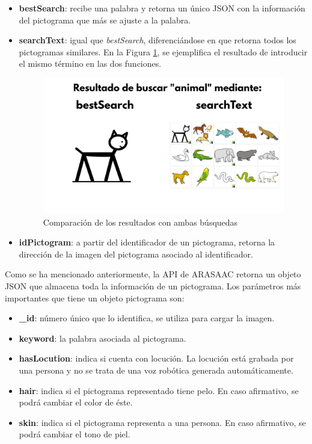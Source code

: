 \begin{itemize}
	\item \textbf{bestSearch}: recibe una palabra y retorna un único JSON con la información del pictograma que más se ajuste a la palabra.
	
	\item \textbf{searchText}: igual que \textit{bestSearch}, diferenciándose en que retorna todos los pictogramas similares. En la Figura \ref{fig:compBusq}, se ejemplifica el resultado de introducir el mismo término en las dos funciones.
	
	 \begin{figure}[h!]
	 	\centering
	 	\includegraphics[width=0.8\linewidth]{Imagenes/Bitmap/techComparacionBusquedas}
	 	\caption{Comparación de los resultados con ambas búsquedas}
	 	\label{fig:compBusq}
	 \end{figure}
	
	\item \textbf{idPictogram}: a partir del identificador de un pictograma, retorna la dirección de la imagen del pictograma asociado al identificador.    
\end{itemize}


Como se ha mencionado anteriormente, la API de ARASAAC retorna un objeto JSON que almacena toda la información de un pictograma. Los parámetros más importantes que tiene un objeto pictograma son: 



\begin{itemize}
	\item \textbf{\_id}: número único que lo identifica, se utiliza para cargar la imagen.
	
	\item \textbf{keyword}: la palabra asociada al pictograma.
	
	\item \textbf{hasLocution}: indica si cuenta con locución. La locución está grabada por una persona y no se trata de una voz robótica generada automáticamente.
	
	\item \textbf{hair}: indica si el pictograma representado tiene pelo. En caso afirmativo, se podrá cambiar el color de éste.
	
	\item \textbf{skin}: indica si el pictograma representa a una persona. En caso afirmativo, se podrá cambiar el tono de piel. 
	
\end{itemize}

